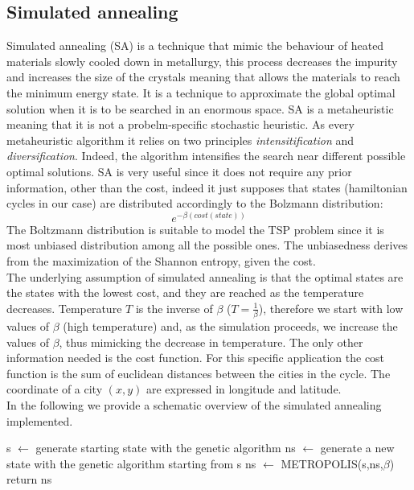\documentclass{article}
\begin{document}
\subsection{Simulated annealing}
Simulated annealing (SA) is a technique that mimic the behaviour of heated materials slowly cooled down in metallurgy, this process decreases the impurity and increases the size of the crystals meaning that allows the materials to reach the minimum energy state. It is a technique to approximate the global optimal solution when it is to be searched in an enormous space. SA is a metaheuristic meaning that it is not a probelm-specific stochastic heuristic. As every metaheuristic algorithm it relies on two principles \textit{intensitification} and \textit{diversification}. Indeed, the algorithm intensifies the search near different possible optimal solutions.
SA is very useful since it does not require any prior information, other than the cost, indeed it just supposes that states (hamiltonian cycles in our case) are distributed accordingly to the Bolzmann distribution:
\begin{equation}
e^{- \beta (cost(state))}
\end{equation}
The Boltzmann distribution is suitable to model the TSP problem since it is most unbiased distribution among all the possible ones. The unbiasedness derives from the maximization of the Shannon entropy, given the cost.\\
The underlying assumption of simulated annealing is that the optimal states are the states with the lowest cost, and they are reached as the temperature decreases. Temperature $T$ is the inverse of $\beta$ ($T = \frac{1}{\beta}$), therefore we start with low values of $\beta$ (high temperature) and, as the simulation proceeds, we increase the values of $\beta$, thus mimicking the decrease in temperature.
The only other information needed is the cost function. For this specific application the cost function is the sum of euclidean distances between the cities in the cycle. The coordinate of a city $(x,y)$ are expressed in longitude and latitude.\\
In the following we provide a schematic overview of the simulated annealing implemented.

\begin{algorithm}[H]
    \begin{algorithmic}[1]
        \State s $\leftarrow$ generate starting state with the genetic algorithm
         	 \State ns $\leftarrow$ generate a new state with the genetic algorithm starting from s
         	\State ns $\leftarrow$ METROPOLIS(s,ns,$\beta$)
         	\EndFor
        \EndFor
        \State return ns
       \EndFunction
\end{algorithmic}
\end{algorithm}
\end{document}
